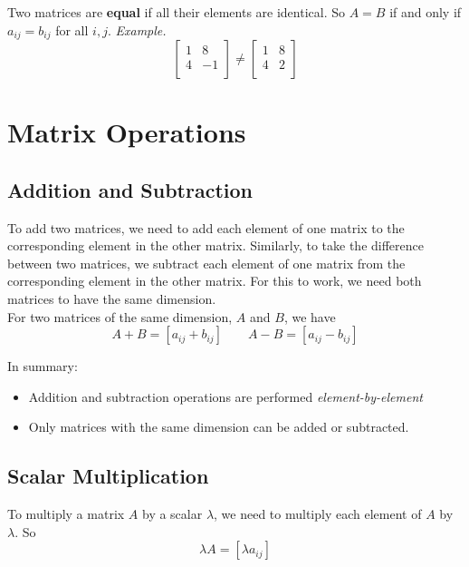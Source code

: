 \documentclass{./../../latex/handout}
\begin{document}
Two matrices are \textbf{equal} if all their elements are identical. So $A=B$ if and only if $a_{ij} = b_{ij}$ for all $i, j$.
\textit{Example.}
\[ \begin{bmatrix}
1 & 8  \\
4 &-1  \\
\end{bmatrix} \neq
 \begin{bmatrix}
1 & 8  \\
4 & 2  \\
\end{bmatrix}\] 


\section{Matrix Operations}

\subsection{Addition and Subtraction}

To add two matrices, we need to add each element of one matrix to the corresponding element in the other matrix. Similarly, to take the difference between two matrices, we subtract each element of one matrix from the corresponding element in the other matrix. For this to work, we need both matrices to have the same dimension. \\

For two matrices of the same dimension, $A$ and $B$, we have 
\[ A + B = [a_{ij}+b_{ij}] \quad \quad A - B = [a_{ij}-b_{ij}] \]


In summary:
\begin{itemize}
\item Addition and subtraction operations are performed \textit{element-by-element}
\item Only matrices with the same dimension can be added or subtracted. 
\end{itemize}

\subsection{Scalar Multiplication}

To multiply a matrix $A$ by a scalar $\lambda$, we need to multiply each element of $A$ by  $\lambda$. So \[ \lambda A = [\lambda a_{ij}]\] \\
\end{document}
